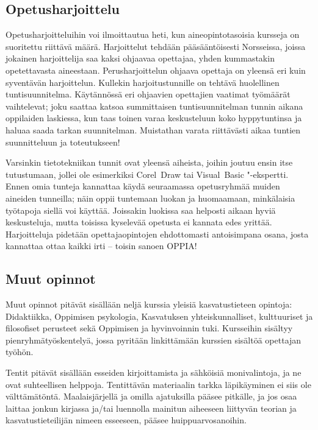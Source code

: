 \documentclass[../ala_hataile.tex]{subfiles}
\begin{document}
\subsection*{Opetusharjoittelu}
Opetus\-harjoitteluihin voi ilmoittautua
heti, kun aine\-opinto\-tasoisia kursseja on suoritettu riittävä
määrä. Harjoittelut tehdään pää\-sääntöisesti
Norsseissa, joissa jokainen harjoittelija saa kaksi
ohjaavaa opettajaa, yhden kummastakin
opetettavasta aineestaan. Perus\-harjoittelun
ohjaava opettaja on yleensä eri kuin
syventävän harjoittelun. Kullekin harjoitus\-tunnille
on tehtävä huolellinen tunti\-suunnitelma.
Käytännössä eri ohjaavien
opettajien vaatimat työmäärät vaihtelevat;
joku saattaa katsoa summittaisen tunti\-suunnitelman
tunnin aikana oppilaiden laskiessa,
kun taas toinen varaa keskusteluun
koko hyppy\-tuntinsa ja haluaa saada tarkan
suunnitelman. Muistathan varata riittävästi
aikaa tuntien suunnitteluun ja toteutukseen!

Varsinkin tieto\-tekniikan tunnit ovat yleensä
aiheista, joihin joutuu ensin itse tutustumaan,
jollei ole esimerkiksi Corel~Draw tai
Visual~Basic "-ekspertti. Ennen omia tunteja
kannattaa käydä seuraamassa opetus\-ryhmää
muiden aineiden tunneilla; näin oppii
tuntemaan luokan ja huomaamaan, minkälaisia
työtapoja siellä voi käyttää. Joissakin
luokissa saa helposti aikaan hyviä keskusteluja,
mutta toisissa kyselevää opetusta ei
kannata edes yrittää. Harjoitteluja pidetään
opettaja\-opintojen ehdottomasti antoisimpana
osana, josta kannattaa ottaa kaikki irti
-- toisin sanoen OPPIA!

\subsection*{Muut opinnot}
Muut opinnot pitävät sisällään neljä
kurssia yleisiä kasvatustieteen opintoja: Didaktiikka, Oppimisen psykologia, Kasvatuksen yhteis\-kunnalliset, kulttuuriset ja filosofiset perusteet sekä Oppimisen ja hyvin\-voinnin tuki. Kursseihin sisältyy pien\-ryhmä\-työskentelyä, jossa pyritään linkittämään kurssien sisältöä opettajan työhön.

Tentit pitävät sisällään esseiden kirjoittamista ja sähköisiä moni\-valintoja,
ja ne ovat suhteellisen helppoja.
Tentittävän materiaalin tarkka läpikäyminen
ei siis ole välttämätöntä. Maalais\-järjellä
ja omilla ajatuksilla pääsee pitkälle,
ja jos osaa laittaa jonkun kirjassa ja/tai luennolla
mainitun aiheeseen liittyvän teorian
ja kasvatus\-tieteilijän nimeen esseeseen,
pääsee huippu\-arvo\-sanoihin.
\end{document}
